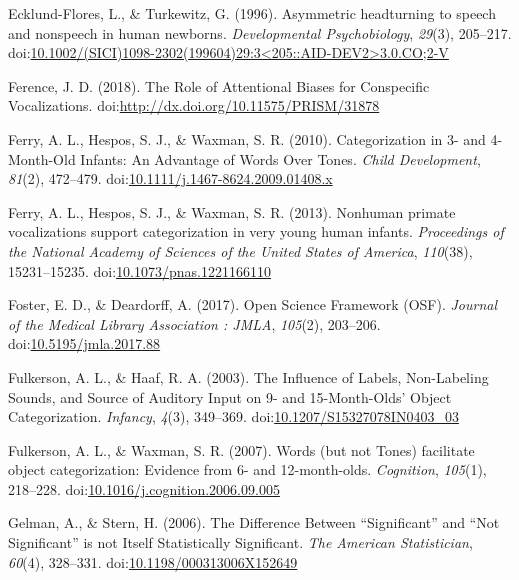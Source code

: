 \documentclass[man,floatsintext]{apa6}
\begin{document}
\hypertarget{ref-ecklund-flores_asymmetric_1996}{}
Ecklund-Flores, L., \& Turkewitz, G. (1996). Asymmetric headturning to
speech and nonspeech in human newborns. \emph{Developmental
Psychobiology}, \emph{29}(3), 205--217.
doi:\href{https://doi.org/10.1002/(SICI)1098-2302(199604)29:3\%3C205::AID-DEV2\%3E3.0.CO;2-V}{10.1002/(SICI)1098-2302(199604)29:3\textless{}205::AID-DEV2\textgreater{}3.0.CO;2-V}

\hypertarget{ref-ference_role_2018}{}
Ference, J. D. (2018). The Role of Attentional Biases for Conspecific
Vocalizations.
doi:\href{https://doi.org/http://dx.doi.org/10.11575/PRISM/31878}{http://dx.doi.org/10.11575/PRISM/31878}

\hypertarget{ref-ferry_categorization_2010}{}
Ferry, A. L., Hespos, S. J., \& Waxman, S. R. (2010). Categorization in
3- and 4-Month-Old Infants: An Advantage of Words Over Tones.
\emph{Child Development}, \emph{81}(2), 472--479.
doi:\href{https://doi.org/10.1111/j.1467-8624.2009.01408.x}{10.1111/j.1467-8624.2009.01408.x}

\hypertarget{ref-ferry_nonhuman_2013}{}
Ferry, A. L., Hespos, S. J., \& Waxman, S. R. (2013). Nonhuman primate
vocalizations support categorization in very young human infants.
\emph{Proceedings of the National Academy of Sciences of the United
States of America}, \emph{110}(38), 15231--15235.
doi:\href{https://doi.org/10.1073/pnas.1221166110}{10.1073/pnas.1221166110}

\hypertarget{ref-foster_open_2017}{}
Foster, E. D., \& Deardorff, A. (2017). Open Science Framework (OSF).
\emph{Journal of the Medical Library Association : JMLA}, \emph{105}(2),
203--206.
doi:\href{https://doi.org/10.5195/jmla.2017.88}{10.5195/jmla.2017.88}

\hypertarget{ref-fulkerson_influence_2003}{}
Fulkerson, A. L., \& Haaf, R. A. (2003). The Influence of Labels,
Non-Labeling Sounds, and Source of Auditory Input on 9- and
15-Month-Olds' Object Categorization. \emph{Infancy}, \emph{4}(3),
349--369.
doi:\href{https://doi.org/10.1207/S15327078IN0403_03}{10.1207/S15327078IN0403\_03}

\hypertarget{ref-fulkerson_words_2007}{}
Fulkerson, A. L., \& Waxman, S. R. (2007). Words (but not Tones)
facilitate object categorization: Evidence from 6- and 12-month-olds.
\emph{Cognition}, \emph{105}(1), 218--228.
doi:\href{https://doi.org/10.1016/j.cognition.2006.09.005}{10.1016/j.cognition.2006.09.005}

\hypertarget{ref-gelman_difference_2006}{}
Gelman, A., \& Stern, H. (2006). The Difference Between ``Significant''
and ``Not Significant'' is not Itself Statistically Significant.
\emph{The American Statistician}, \emph{60}(4), 328--331.
doi:\href{https://doi.org/10.1198/000313006X152649}{10.1198/000313006X152649}
\end{document}
